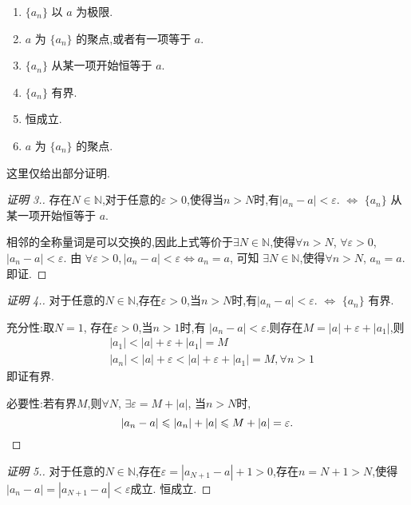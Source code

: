 \begin{solution}
    \begin{enumerate}
        \item $\{a_n\}$ 以 $a$ 为极限.
        \item $a$ 为 $\{a_n\}$ 的聚点,或者有一项等于 $a$.
        \item $\{a_n\}$ 从某一项开始恒等于 $a$.
        \item $\{a_n\}$ 有界.
        \item 恒成立.
        \item $a$ 为 $\{a_n\}$ 的聚点.
    \end{enumerate}
\end{solution}

这里仅给出部分证明.
\begin{proof}
    [证明 3.] 存在$N\in \mathbb{N}$,对于任意的$\varepsilon>0$,使得当$n>N$时,有$|a_n-a|<\varepsilon$. $\Leftrightarrow$ $\{a_n\}$ 从某一项开始恒等于 $a$.

    相邻的全称量词是可以交换的,因此上式等价于$\exists N\in \mathbb{N}$,使得$\forall n > N$, $\forall \varepsilon > 0$, $|a_n - a| < \varepsilon$. 由 $\forall \varepsilon > 0, |a_n - a| < \varepsilon \Leftrightarrow a_n = a$, 可知 $\exists N\in \mathbb{N}$,使得$\forall n > N$, $a_n = a$. 即证.
\end{proof}

\begin{proof}
    [证明 4.] 对于任意的$N\in \mathbb{N}$,存在$\varepsilon>0$,当$n>N$时,有$|a_n-a|<\varepsilon$. $\Leftrightarrow$ $\{a_n\}$ 有界.

    充分性:取$N=1$, 存在$\varepsilon > 0$,当$n > 1$时,有 $|a_n - a | < \varepsilon$.则存在$M = |a| + \varepsilon + |a_1|$,则
    \begin{align*}
         & |a_1| < |a| + \varepsilon + |a_1| = M                                    \\
         & |a_n| < |a| + \varepsilon < |a| + \varepsilon + |a_1| = M, \forall n > 1
    \end{align*}
    即证有界.

    必要性:若有界$M$,则$\forall N$, $\exists \varepsilon  = M + |a|$, 当$n > N$时,
    $$|a_n - a| \leqslant |a_n| + |a| \leqslant M + |a| = \varepsilon.$$
\end{proof}

\begin{proof}
    [证明 5.] 对于任意的$N\in \mathbb{N}$,存在$\varepsilon = |a_{N+1} - a| + 1 > 0$,存在$n = N + 1 > N$,使得$|a_n - a| = |a_{N+1} - a| < \varepsilon$成立. 恒成立.
\end{proof}

